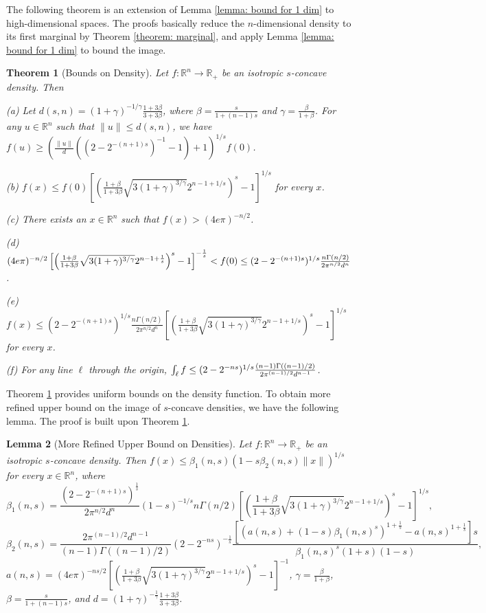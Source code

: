\documentclass[11pt]{article}
\newcommand{\R}{\mathbb{R}}
\newcommand{\red}[1]{{\color{black}#1}}
\newtheorem{theorem}{Theorem}
\newtheorem{lemma}[theorem]{Lemma}
\begin{document}
The following theorem is an extension of Lemma \ref{lemma: bound for 1 dim} to high-dimensional spaces. The proofs basically reduce the $n$-dimensional density to its first marginal by Theorem \ref{theorem: marginal}, and apply Lemma \ref{lemma: bound for 1 dim} to bound the image.
\begin{theorem}[Bounds on Density]
\label{theorem: upper and lower bounds}
Let $f:\R^n\rightarrow\R_+$ be an isotropic $s$-concave density. Then

(a) Let $d(s,n)=(1+\gamma)^{-1/\gamma}\frac{1+3\beta}{3+3\beta}$, where $\beta=\frac{s}{1+(n-1)s}$ and $\gamma=\frac{\beta}{1+\beta}$. For any $u\in\R^n$ such that $\|u\|\le d(s,n)$, we have \red{$f(u)\ge \left(\frac{\|u\|}{d}((2-2^{-(n+1)s})^{-1}-1)+1\right)^{1/s}f(0)$}.

(b) $f(x)\le f(0)\left[\left(\frac{1+\beta}{1+3\beta}\sqrt{3(1+\gamma)^{3/\gamma}}2^{n-1+1/s}\right)^{s}-1\right]^{1/s}$ for every $x$.

(c) There exists an $x\in\R^n$ such that $f(x)>(4e\pi)^{-n/2}$.

(d) $(4e\pi)^{-n/2}\left[\left(\frac{1+\beta}{1+3\beta}\sqrt{3(1+\gamma)^{3/\gamma}}2^{n-1+\frac{1}{s}}\right)^{s}-1\right]^{-\frac{1}{s}}<f(0)\le \red{(2-2^{-(n+1)s})^{1/s}\frac{n\Gamma(n/2)}{2\pi^{n/2}d^n}}$.

(e) \red{$f(x)\le (2-2^{-(n+1)s})^{1/s}\frac{n\Gamma(n/2)}{2\pi^{n/2}d^n}\left[\left(\frac{1+\beta}{1+3\beta}\sqrt{3(1+\gamma)^{3/\gamma}}2^{n-1+1/s}\right)^{s}-1\right]^{1/s}$} for every $x$.

(f) For any line $\ell$ through the origin, $\int_{\ell} f \le \red{(2-2^{-ns})^{1/s}\frac{(n-1)\Gamma((n-1)/2)}{2\pi^{(n-1)/2}d^{n-1}}}$.
\end{theorem}

Theorem \ref{theorem: upper and lower bounds} provides uniform bounds on the density function. To obtain more refined upper bound on the image of $s$-concave densities, we have the following lemma. The proof is built upon Theorem \ref{theorem: upper and lower bounds}.
\begin{lemma}[More Refined Upper Bound on Densities]
\label{lemma: more refined upper bound}
Let $f:\R^n\rightarrow \R_+$ be an isotropic $s$-concave density. Then $f(x)\le \beta_1(n,s)(1-s\beta_2(n,s)\|x\|)^{1/s}$ for every $x\in\R^n$, where
\begin{equation*}
\beta_1(n,s)=\frac{(2-2^{-(n+1)s})^{\frac{1}{s}}}{2\pi^{n/2}d^n}(1-s)^{-1/s}n\Gamma(n/2)\left[\left(\frac{1+\beta}{1+3\beta}\sqrt{3(1+\gamma)^{3/\gamma}}2^{n-1+1/s}\right)^{s}-1\right]^{1/s},
\end{equation*}
\begin{equation*}
\beta_2(n,s)=\frac{2\pi^{(n-1)/2}d^{n-1}}{(n-1)\Gamma((n-1)/2)}(2-2^{-ns})^{-\frac{1}{s}}\frac{[(a(n,s)+(1-s)\beta_1(n,s)^s)^{1+\frac{1}{s}}-a(n,s)^{1+\frac{1}{s}}]s}{\beta_1(n,s)^s(1+s)(1-s)},
\end{equation*}
$a(n,s)=(4e\pi)^{-ns/2}\left[\left(\frac{1+\beta}{1+3\beta}\sqrt{3(1+\gamma)^{3/\gamma}}2^{n-1+1/s}\right)^{s}-1\right]^{-1}$, $\gamma=\frac{\beta}{1+\beta}$,
$\beta=\frac{s}{1+(n-1)s}$, and $d=(1+\gamma)^{-\frac{1}{\gamma}}\frac{1+3\beta}{3+3\beta}$.
\end{lemma}
\end{document}
